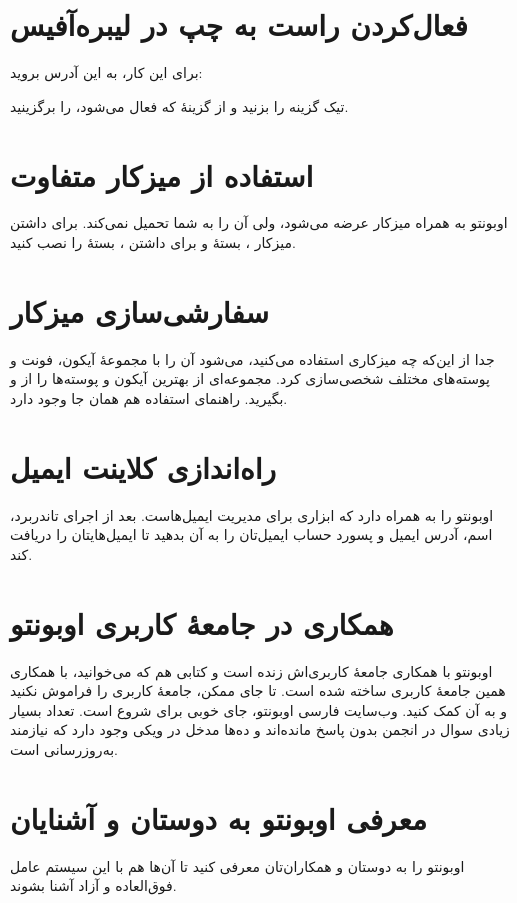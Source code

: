 \section{فعال‌کردن راست به چپ در لیبره‌آفیس}
برای این کار، به این آدرس بروید:\\
\begin{flushleft}
\end{flushleft}
تیک گزینه  را بزنید و از گزینهٔ  که فعال می‌شود،  را برگزینید.

\section{استفاده از میزکار متفاوت}
اوبونتو به همراه میزکار  عرضه می‌شود، ولی آن را به شما تحمیل نمی‌کند. برای داشتن میزکار ، بستهٔ  و برای داشتن ، بستهٔ  را نصب کنید.

\section{سفارشی‌سازی میزکار}
جدا از این‌که چه میزکاری استفاده می‌کنید، می‌شود آن را با مجموعهٔ آیکون، فونت و پوسته‌های مختلف شخصی‌سازی کرد. مجموعه‌ای از بهترین آیکون و پوسته‌ها را از  و  بگیرید. راهنمای استفاده هم همان جا وجود دارد.

\section{راه‌اندازی کلاینت ایمیل}
اوبونتو  را به همراه دارد که ابزاری برای مدیریت ایمیل‌هاست. بعد از اجرای تاندربرد، اسم، آدرس ایمیل و پسورد حساب ایمیل‌تان را به آن بدهید تا ایمیل‌هایتان را دریافت کند.

\section{همکاری در جامعهٔ کاربری اوبونتو}
اوبونتو با همکاری جامعهٔ کاربری‌اش زنده است و کتابی هم که می‌خوانید، با همکاری همین جامعهٔ کاربری ساخته شده است. تا جای ممکن، جامعهٔ کاربری را فراموش نکنید و به آن کمک کنید. وب‌سایت فارسی اوبونتو، جای خوبی برای شروع است. تعداد بسیار زیادی سوال در انجمن بدون پاسخ مانده‌اند و ده‌ها مدخل در ویکی وجود دارد که نیازمند به‌روزرسانی است.

\section{معرفی اوبونتو به دوستان و آشنایان}
اوبونتو را به دوستان و همکاران‌تان معرفی کنید تا آن‌ها هم با این سیستم عامل فوق‌العاده و آزاد آشنا بشوند.
